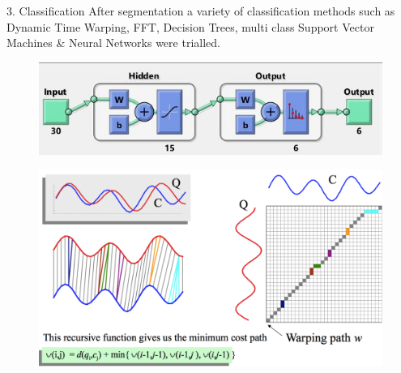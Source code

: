 \documentclass[ %
                    author={Liam O'Shea},
                supervisor={Dr. Sion Hannuna},
                     title={ZeroToHero},
                  subtitle={},
                    degree={Bsc},
                      year={2014} ]{poster}
\begin{document}
\begin{frame}{}

\begin{columns}[t]
    \begin{column}{0.422\linewidth}
    \begin{block}{\normalsize 3. Classification}
    \small  After segmentation a variety of classification methods such as Dynamic Time Warping, FFT, Decision Trees, multi class Support Vector Machines \&  Neural Networks were trialled.
    \vspace{2.00mm}
    \begin{figure}[h]
        \includegraphics[width=0.28\textheight]{images/neuralnet}
    \end{figure}
    \begin{figure}[h]
        \includegraphics[height=0.15\textheight, width=0.30\textheight]{images/dtw-pdf.pdf}
    \end{figure}   
    \end{block}
    \end{column}
    

\end{columns}
\end{frame}
\end{document}
